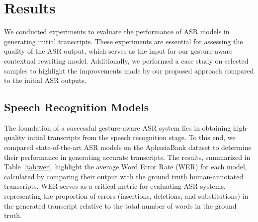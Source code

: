 \section{Results}

We conducted experiments to evaluate the performance of ASR models in generating initial transcripts. These experiments are essential for assessing the quality of the ASR output, which serves as the input for our gesture-aware contextual rewriting model. Additionally, we performed a case study on selected samples to highlight the improvements made by our proposed approach compared to the initial ASR outputs.



\subsection{Speech Recognition Models}

\begin{table}[t]
\centering
\caption{The Average Word Error Rate (WER) between original transcript and ASR results.}\label{tab:wer}
\end{table}

The foundation of a successful gesture-aware ASR system lies in obtaining high-quality initial transcripts from the speech recognition stage. To this end, we compared state-of-the-art ASR models on the AphasiaBank dataset to determine their performance in generating accurate transcripts. The results, summarized in Table~\ref{tab:wer}, highlight the average Word Error Rate (WER) for each model, calculated by comparing their output with the ground truth human-annotated transcripts. WER serves as a critical metric for evaluating ASR systems, representing the proportion of errors (insertions, deletions, and substitutions) in the generated transcript relative to the total number of words in the ground truth.

